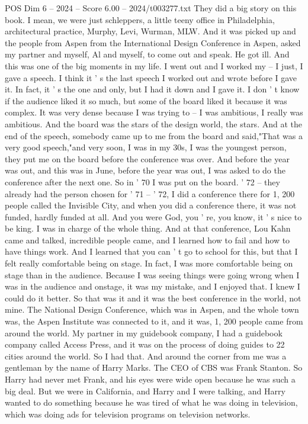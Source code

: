 \begin{textsample}{POS Dim 6 – 2024 – Score 6.00 – 2024/t003277.txt}
They did a big story on this book.
I mean, we were just schleppers, a little teeny office in Philadelphia, architectural practice, Murphy, Levi, Wurman, MLW.
And it was picked up and the people from Aspen from the International Design Conference in Aspen, asked my partner and myself, Al and myself, to come out and speak.
He got ill.
And this was one of the big moments in my life.
I went out and I worked my -- I just, I gave a speech.
I think it ' s the last speech I worked out and wrote before I gave it.
In fact, it ' s the one and only, but I had it down and I gave it.
I don ' t know if the audience liked it so much, but some of the board liked it because it was complex.
It was very dense because I was trying to -- I was ambitious, I really was ambitious.
And the board was the stars of the design world, the stars.
And at the end of the speech, somebody came up to me from the board and said,"That was a very good speech,"and very soon, I was in my 30s, I was the youngest person, they put me on the board before the conference was over.
And before the year was out, and this was in June, before the year was out, I was asked to do the conference after the next one.
So in ' 70 I was put on the board. ' 72 -- they already had the person chosen for ' 71 -- ' 72, I did a conference there for 1, 200 people called the Invisible City, and when you did a conference there, it was not funded, hardly funded at all.
And you were God, you ' re, you know, it ' s nice to be king.
I was in charge of the whole thing.
And at that conference, Lou Kahn came and talked, incredible people came, and I learned how to fail and how to have things work.
And I learned that you can ' t go to school for this, but that I felt really comfortable being on stage.
In fact, I was more comfortable being on stage than in the audience.
Because I was seeing things were going wrong when I was in the audience and onstage, it was my mistake, and I enjoyed that.
I knew I could do it better.
So that was it and it was the best conference in the world, not mine.
The National Design Conference, which was in Aspen, and the whole town was, the Aspen Institute was connected to it, and it was, 1, 200 people came from around the world.
My partner in my guidebook company, I had a guidebook company called Access Press, and it was on the process of doing guides to 22 cities around the world.
So I had that.
And around the corner from me was a gentleman by the name of Harry Marks.
The CEO of CBS was Frank Stanton.
So Harry had never met Frank, and his eyes were wide open because he was such a big deal.
But we were in California, and Harry and I were talking, and Harry wanted to do something because he was tired of what he was doing in television, which was doing ads for television programs on television networks.

\end{textsample}
